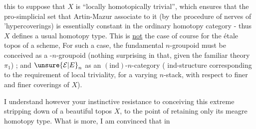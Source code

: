 %
this to suppose that $X$ is ``locally homotopically trivial'', which ensures that the pro-simplicial set that Artin-Mazur associate to it (by the procedure of nerves of 'hypercoverings) is essentially constant in the ordinary homotopy category - thus $X$ defines a usual homotopy type. This is \uline{not} the case of course for the étale topos of a scheme, For such a case, the fundamental $n$-groupoid must be conceived as a -$n$-groupoid (nothing surprising in that, given the familiar theory  $\pi_1$) ; and $\unsure{\mathcal E|E}_n$ as an $(\mathrm{ind})$-$n$-category ( ind-structure corresponding to the requirement of local triviality, for a varying $n$-stack, with respect to finer and finer coverings of $X$).


I understand however your instinctive resistance to conceiving this extreme stripping down of a beautiful topos $X$, to the point of%
retaining only its meagre homotopy type. What is more, I am convinced that in%

